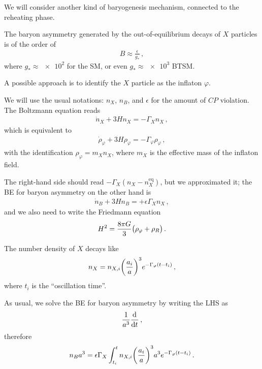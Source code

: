 \documentclass[main.tex]{subfiles}
\begin{document}

We will consider another kind of baryogenesis mechanism, connected to the reheating phase. 

The baryon asymmetry generated by the out-of-equilibrium decays of \(X\) particles is of the order of 
%
\begin{align}
B \approx \frac{\epsilon}{g_*}
\,,
\end{align}
%
where \(g_* \approx \num{e2}\) for the SM, or even \(g_* \approx \num{e3}\) BTSM.

A possible approach is to identify the \(X\) particle as the inflaton \(\varphi \). 

We will use the usual notations: \(n_X\), \(n_B\), and \(\epsilon \) for the amount of \(CP\) violation.
The Boltzmann equation reads 
%
\begin{align}
\dot{n}_X + 3H n_X = - \Gamma _X n_X
\,,
\end{align}
%
which is equivalent to 
%
\begin{align}
\dot{\rho}_\varphi + 3 H \rho _\varphi = - \Gamma _\varphi \rho _\varphi 
\,,
\end{align}
%
with the identification \(\rho _\varphi = m_X n_X\), where \(m_X\) is the effective mass of the inflaton field. 

The right-hand side should read \(- \Gamma _X (n_X - n_X^{\text{eq}})\), but we approximated it; the BE for baryon asymmetry on the other hand is 
%
\begin{align}
\dot{n}_B + 3 H n_B = +\epsilon \Gamma _X n_X
\,,
\end{align}
%
and we also need to write the Friedmann equation 
%
\begin{align}
H^2 = \frac{8 \pi G}{3} \qty(\rho _\varphi +\rho _R)
\,.
\end{align}

The number density of \(X\) decays like 
%
\begin{align}
n_X = n_{X, i} \qty(\frac{a_i}{a})^3 e^{-\Gamma _\varphi (t - t_i)}
\,,
\end{align}
%
where \(t_i\) is the ``oscillation time''. 

As usual, we solve the BE for baryon asymmetry by writing the LHS as 
%
\begin{align}
\frac{1}{a^3} \dv[]{}{t} (n_B a^3) 
\,,
\end{align}
%
therefore 
%
\begin{align}
n_B a^3 = \epsilon \Gamma _X \int_{t_i}^{t} n_{X, i} \qty(\frac{a_i}{a})^3 a^3e^{- \Gamma _\varphi (t - t_i)}
\,.
\end{align}
\end{document}
